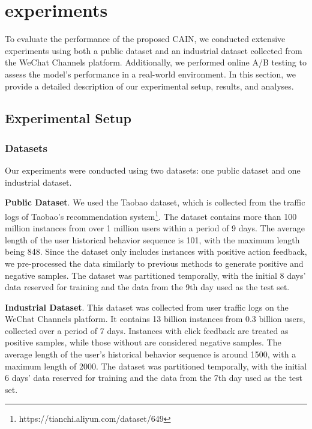\section{experiments}

To evaluate the performance of the proposed CAIN, we conducted extensive experiments using both a public dataset and an industrial dataset collected from the WeChat Channels platform. Additionally, we performed online A/B testing to assess the model's performance in a real-world environment. In this section, we provide a detailed description of our experimental setup, results, and analyses. 

\subsection{Experimental Setup}

\subsubsection{\textbf{Datasets}}

Our experiments were conducted using two datasets: one public dataset and one industrial dataset.

\textbf{Public Dataset}. We used the Taobao dataset, which is collected from the traffic logs of Taobao's recommendation system\footnote{https://tianchi.aliyun.com/dataset/649}. The dataset contains more than 100 million instances from over 1 million users within a period of 9 days. The average length of the user historical behavior sequence is 101, with the maximum length being 848. Since the dataset only includes instances with positive action feedback, we pre-processed the data similarly to previous methods \cite{pi2019practice, chen2022efficient} to generate positive and negative samples. The dataset was partitioned temporally, with the initial 8 days' data reserved for training and the data from the 9th day used as the test set. 

\textbf{Industrial Dataset}. This dataset was collected from user traffic logs on the WeChat Channels platform. It contains 13 billion instances from 0.3 billion users, collected over a period of 7 days. Instances with click feedback are treated as positive samples, while those without are considered negative samples. The average length of the user's historical behavior sequence is around 1500, with a maximum length of 2000. The dataset was partitioned temporally, with the initial 6 days' data reserved for training and the data from the 7th day used as the test set. 

